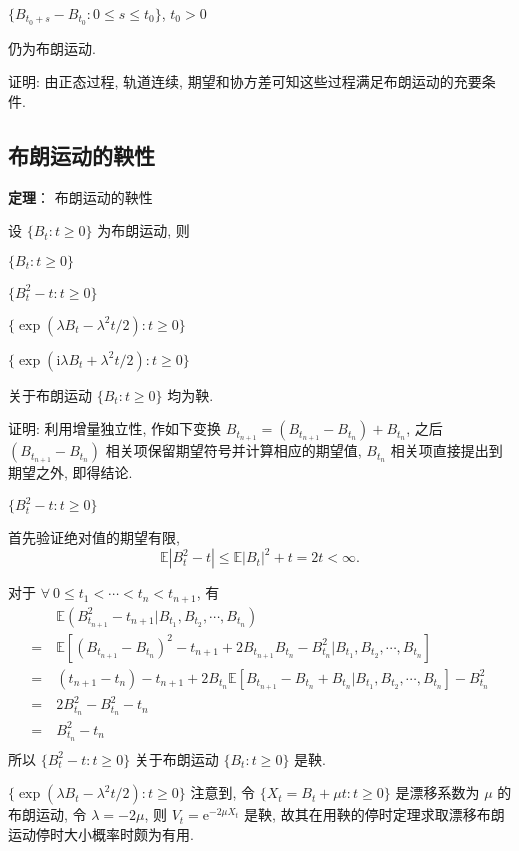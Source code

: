 \documentclass[openany]{ctexbook}
\theoremstyle{kaiti}
\theoremstyle{normal}
\begin{document}
$\{B_{t_0+s}-B_{t_0}:0\leqslant s\leqslant t_0\}$, $t_0>0$

仍为布朗运动.

证明: 由正态过程, 轨道连续, 期望和协方差可知这些过程满足布朗运动的充要条件.

\subsection{布朗运动的鞅性}

\textbf{定理}： 布朗运动的鞅性

设 $\{B_t:t\geqslant0\}$ 为布朗运动, 则

$\{B_t:t\geqslant0\}$

$\{B_t^2-t:t\geqslant0\}$

$\{\exp(\lambda B_t-\lambda^2t/2):t\geqslant0\}$

$\{\exp(\mathrm{i}\lambda B_t+\lambda^2t/2):t\geqslant0\}$

关于布朗运动 $\{B_t:t\geqslant0\}$ 均为鞅.

证明: 利用增量独立性, 作如下变换 $B_{t_{n+1}}=(B_{t_{n+1}}-B_{t_{n}})+B_{t_{n}}$, 之后 $(B_{t_{n+1}}-B_{t_{n}})$ 相关项保留期望符号并计算相应的期望值, $B_{t_{n}}$ 相关项直接提出到期望之外, 即得结论.

$\{B_t^2-t:t\geqslant0\}$

首先验证绝对值的期望有限,
\begin{equation}
  \mathbb{E}|B_t^2-t|\leqslant \mathbb{E}|B_t|^2+t= 2t<\infty.
\end{equation}

对于 $\forall~0\leqslant t_1<\cdots< t_n< t_{n+1}$, 有
\begin{equation}
  \begin{aligned}
    &~\mathbb{E}(B_{t_{n+1}}^2-t_{n+1}\big|B_{t_1},B_{t_2},\cdots,B_{t_n})\\
    =&~\mathbb{E}[(B_{t_{n+1}}-B_{t_n})^2-t_{n+1}+2B_{t_{n+1}}B_{t_n}-B_{t_n}^2\big|B_{t_1},B_{t_2},\cdots,B_{t_n}]\\
    =&~(t_{n+1}-t_n)-t_{n+1}+2B_{t_n}\mathbb{E}[B_{t_{n+1}}-B_{t_n}+B_{t_n}\big|B_{t_1},B_{t_2},\cdots,B_{t_n}]-B_{t_n}^2\\
    =&~2B_{t_n}^2-B_{t_n}^2-t_n\\
    =&~B_{t_n}^2-t_n\\
  \end{aligned}
\end{equation}
所以 $\{B_t^2-t:t\geqslant0\}$ 关于布朗运动 $\{B_t:t\geqslant0\}$ 是鞅.

$\{\exp(\lambda B_t-\lambda^2t/2):t\geqslant0\}$
注意到, 令 $\{X_t=B_t+\mu t:t\geqslant0\}$ 是漂移系数为 $\mu$ 的布朗运动, 令 $\lambda=-2\mu$, 则 $V_t=\mathrm{e}^{-2\mu X_t}$ 是鞅, 故其在用鞅的停时定理求取漂移布朗运动停时大小概率时颇为有用.
\end{document}
